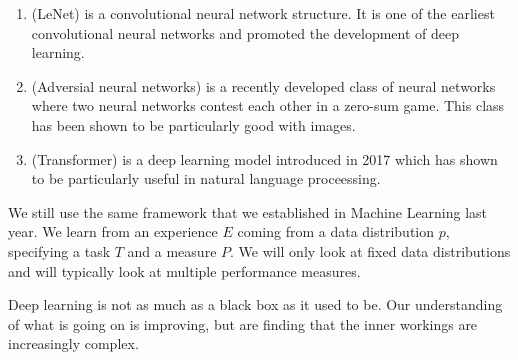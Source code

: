\begin{examples}
	\begin{enumerate}
		\item (LeNet) is a convolutional neural network structure.
			It is one of the earliest convolutional neural networks and 
			promoted the development of deep learning.

		\item (Adversial neural networks) is a recently developed class of neural
			networks where two neural networks contest each other in a zero-sum
			game. This class has been shown to be particularly good with images.

		\item (Transformer) is a deep learning model introduced in 2017 which has
			shown to be particularly useful in natural language proceessing.
	\end{enumerate}
\end{examples}

We still use the same framework that we established in Machine Learning last
year.
We learn from an experience $E$ coming from a data distribution $p$, specifying
a task $T$ and a measure $P$.
We will only look at fixed data distributions and will typically look at multiple
performance measures.

\begin{remark}
	Deep learning is not as much as a black box as it used to be.
	Our understanding of what is going on is improving, but are finding that the
	inner workings are increasingly complex.
\end{remark}
